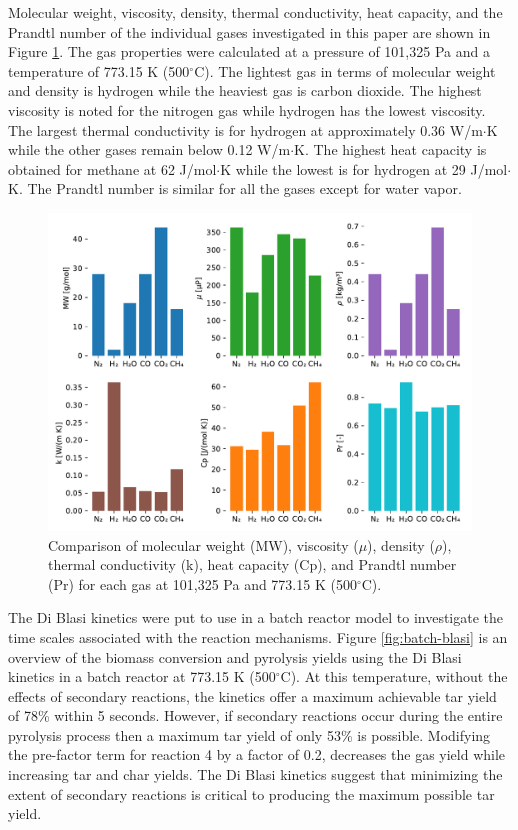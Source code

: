 \documentclass{article}
\begin{document}
Molecular weight, viscosity, density, thermal conductivity, heat capacity, and the Prandtl number of the individual gases investigated in this paper are shown in Figure \ref{fig:gas-properties}. The gas properties were calculated at a pressure of 101,325 Pa and a temperature of 773.15 K (500$^\circ$C). The lightest gas in terms of molecular weight and density is hydrogen while the heaviest gas is carbon dioxide. The highest viscosity is noted for the nitrogen gas while hydrogen has the lowest viscosity. The largest thermal conductivity is for hydrogen at approximately 0.36 W/m$\cdot$K while the other gases remain below 0.12 W/m$\cdot$K. The highest heat capacity is obtained for methane at 62 J/mol$\cdot$K while the lowest is for hydrogen at 29 J/mol$\cdot$K. The Prandtl number is similar for all the gases except for water vapor.

\begin{figure}[H]
    \centering
    \includegraphics[width=\textwidth]{gas-properties.pdf}
    \caption{Comparison of molecular weight (MW), viscosity ($\mu$), density ($\rho$), thermal conductivity (k), heat capacity (Cp), and Prandtl number (Pr) for each gas at 101,325 Pa and 773.15 K (500$^\circ$C).}
    \label{fig:gas-properties}
\end{figure}

The Di Blasi kinetics were put to use in a batch reactor model to investigate the time scales associated with the reaction mechanisms. Figure \ref{fig:batch-blasi} is an overview of the biomass conversion and pyrolysis yields using the Di Blasi kinetics in a batch reactor at 773.15 K (500$^\circ$C). At this temperature, without the effects of secondary reactions, the kinetics offer a maximum achievable tar yield of 78\% within 5 seconds. However, if secondary reactions occur during the entire pyrolysis process then a maximum tar yield of only 53\% is possible. Modifying the pre-factor term for reaction 4 by a factor of 0.2, decreases the gas yield while increasing tar and char yields. The Di Blasi kinetics suggest that minimizing the extent of secondary reactions is critical to producing the maximum possible tar yield.
\end{document}

